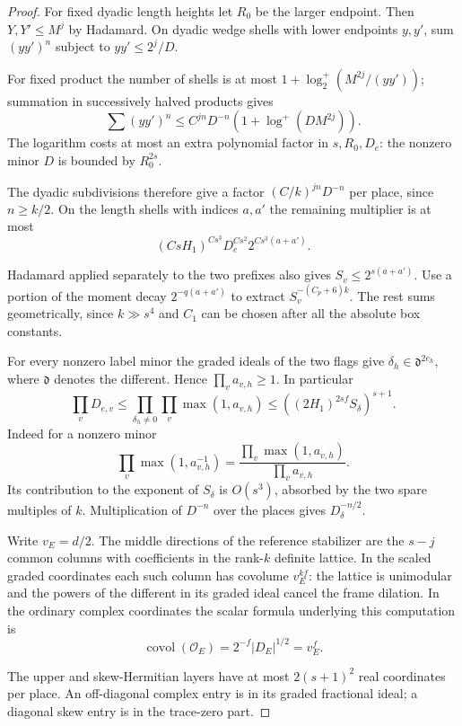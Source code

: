\begin{proof}
For fixed dyadic length heights let \(R_0\) be the larger endpoint. Then \(Y,Y'\le M^j\) by Hadamard. On dyadic wedge shells with lower endpoints \(y,y'\), sum \((yy')^n\) subject to \(yy'\le 2^j/D\). 

For fixed product the number of shells is at most \(1+\log_2^+(M^{2j}/(yy'))\); summation in successively halved products gives
\[
       \sum (yy')^n\le C^{jn}D^{-n}
                (1+\log^+(DM^{2j})).
\]
The logarithm costs at most an extra polynomial factor in \(s,R_0,D_e\): the nonzero minor \(D\) is bounded by \(R_0^{2s}\). 

The dyadic subdivisions therefore give a factor \((C/k)^{jn}D^{-n}\) per place, since \(n\ge k/2\). On the length shells with indices \(a,a'\) the remaining multiplier is at most
\[
              (CsH_1)^{Cs^3}D_e^{Cs^2}2^{Cs^3(a+a')}.
\]

Hadamard applied separately to the two prefixes also gives \(S_v\le 2^{s(a+a')}\). Use a portion of the moment decay \(2^{-q(a+a')}\) to extract \(S_v^{-(C_p+6)k}\). The rest sums geometrically, since \(k\gg s^4\) and \(C_1\) can be chosen after all the absolute box constants. 

For every nonzero label minor the graded ideals of the two flags give \(\delta_h\in\mathfrak d^{2e_h}\), where \(\mathfrak d\) denotes the different. Hence \(\prod_v a_{v,h}\ge1\). In particular
\[
 \prod_v D_{e,v}\le\prod_{\delta_h\ne0}\prod_v\max(1,a_{v,h})
                 \le ((2H_1)^{2sf} S_\delta)^{s+1}.
\]
Indeed for a nonzero minor
\[
       \prod_v\max(1,a^{-1}_{v,h})
             =\frac{\prod_v\max(1,a_{v,h})}{\prod_v a_{v,h}} .
\] Its contribution to the exponent of \(S_\delta\) is \(O(s^3)\), absorbed by the two spare multiples of \(k\). Multiplication of \(D^{-n}\) over the places gives \(D_\delta^{-n/2}\).

Write \(v_E=d/2\). The middle directions of the reference stabilizer are the \(s-j\) common columns with coefficients in the rank-\(k\) definite lattice. In the scaled graded coordinates each such column has covolume \(v_E^{kf}\): the lattice is unimodular and the powers of the different in its graded ideal cancel the frame dilation. In the ordinary complex coordinates the scalar formula underlying this computation is
\[
      \operatorname{covol}(\mathcal O_E)=2^{-f}|D_E|^{1/2}=v_E^f .
\]

 The upper and skew-Hermitian layers have at most \(2(s+1)^2\) real coordinates per place. An off-diagonal complex entry is in its graded fractional ideal; a diagonal skew entry is in the trace-zero part. 


\end{proof}

